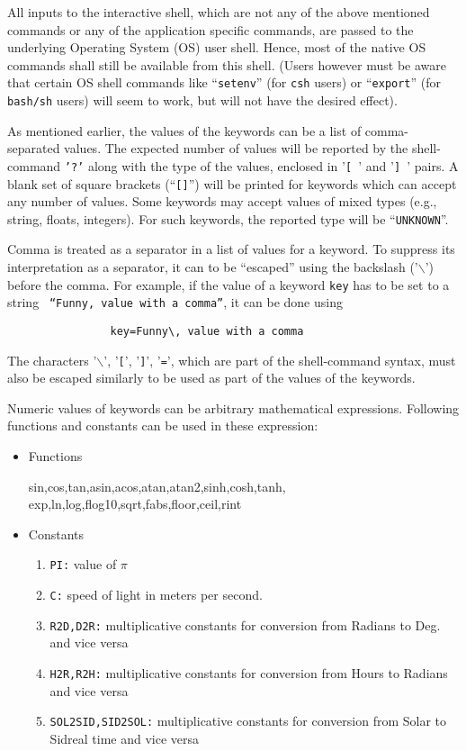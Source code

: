 \documentclass[11pt]{article}
\begin{document}
All inputs to the interactive shell, which are not any of the above
mentioned commands or any of the application specific commands, are
passed to the underlying Operating System (OS) user shell.  Hence,
most of the native OS commands shall still be available from this
shell.  (Users however must be aware that certain OS shell commands
like ``{\tt setenv}'' (for {\tt csh} users) or ``{\tt export}'' (for
{\tt bash/sh} users) will seem to work, but will not have the desired
effect).

As mentioned earlier, the values of the keywords can be a list of
comma-separated values.  The expected number of values will be
reported by the shell-command {\tt '?'} along with the type of the
values, enclosed in '{\tt [ }' and '{\tt ] }' pairs.  A blank set of
square brackets (``{\tt []}'') will be printed for keywords which can
accept any number of values.  Some keywords may accept values of mixed
types (e.g., string, floats, integers).  For such keywords, the
reported type will be ``{\tt UNKNOWN}''.

Comma is treated as a separator in a list of values for a keyword.  To
suppress its interpretation as a separator, it can to be ``escaped''
using the backslash ('$\backslash$') before the comma.  For example,
if the value of a keyword {\tt key} has to be set to a string {\tt
``Funny, value with a comma''}, it can be done using

\begin{verbatim}
                key=Funny\, value with a comma
\end{verbatim}

The characters '$\backslash$', '{\tt [}', '{\tt ]}', '{\tt =}', which
are part of the shell-command syntax, must also be escaped similarly
to be used as part of the values of the keywords.

Numeric values of keywords can be arbitrary mathematical expressions.
Following functions and constants can be used in these expression:

\begin{itemize}
\item Functions

sin,cos,tan,asin,acos,atan,atan2,sinh,cosh,tanh,\\
exp,ln,log,flog10,sqrt,fabs,floor,ceil,rint


\item Constants
\begin{enumerate}

\item {\tt PI:} value of $\pi$
\item {\tt C:} speed of light in meters per second.
\item {\tt R2D,D2R:} multiplicative constants for conversion from
Radians to Deg. and vice versa
\item {\tt H2R,R2H:} multiplicative constants for conversion from
Hours to Radians and vice versa
\item {\tt SOL2SID,SID2SOL:} multiplicative constants for conversion
from Solar to Sidreal time and vice versa
\end{enumerate}
\end{itemize}
\end{document}
